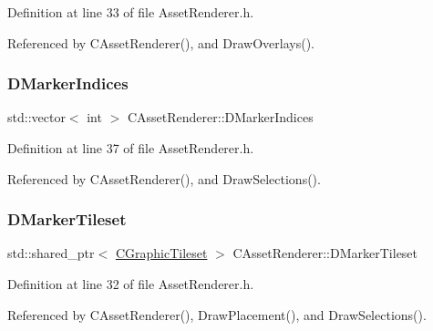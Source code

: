 Definition at line 33 of file Asset\+Renderer.\+h.



Referenced by C\+Asset\+Renderer(), and Draw\+Overlays().

\hypertarget{classCAssetRenderer_a912a2f38f04bc2e5347f972f8f0caa56}{}\label{classCAssetRenderer_a912a2f38f04bc2e5347f972f8f0caa56} 
\subsubsection{\texorpdfstring{D\+Marker\+Indices}{DMarkerIndices}}
{\footnotesize\ttfamily std\+::vector$<$ int $>$ C\+Asset\+Renderer\+::\+D\+Marker\+Indices\hspace{0.3cm}{\ttfamily [protected]}}



Definition at line 37 of file Asset\+Renderer.\+h.



Referenced by C\+Asset\+Renderer(), and Draw\+Selections().

\hypertarget{classCAssetRenderer_afc1e190959f7fd837d6aeb5858cca059}{}\label{classCAssetRenderer_afc1e190959f7fd837d6aeb5858cca059} 
\subsubsection{\texorpdfstring{D\+Marker\+Tileset}{DMarkerTileset}}
{\footnotesize\ttfamily std\+::shared\+\_\+ptr$<$ \hyperlink{classCGraphicTileset}{C\+Graphic\+Tileset} $>$ C\+Asset\+Renderer\+::\+D\+Marker\+Tileset\hspace{0.3cm}{\ttfamily [protected]}}



Definition at line 32 of file Asset\+Renderer.\+h.



Referenced by C\+Asset\+Renderer(), Draw\+Placement(), and Draw\+Selections().

\hypertarget{classCAssetRenderer_adfa7285e46e798a7d34a935bc7a6df6c}{}\label{classCAssetRenderer_adfa7285e46e798a7d34a935bc7a6df6c} 
